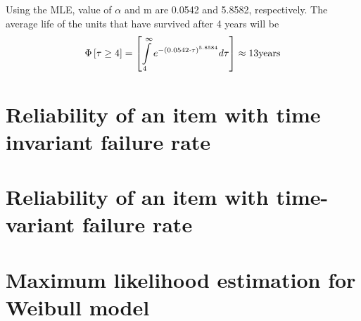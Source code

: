 Using the MLE, value of $\alpha $ and m are 0.0542 and 5.8582, respectively. The
average life of the units that have survived after 4 years will be
\[
\Phi \left[ {\tau  \ge 4} \right] = \left[ {\int\limits_4^\infty  {{e^{ -
{{(0.0542 \cdot \tau )}^{5.8584}}}}d\tau } } \right] \approx 13{\rm{ years}}
\]



\pagebreak

\begin{subappendices}
\section{Reliability of an item with time invariant failure rate}\label{appen31}

\pagebreak
\section{Reliability of an item with time-variant failure rate}\label{appen32}

\pagebreak
\section{Maximum likelihood estimation for Weibull model}\label{appen33}

\end{subappendices}
